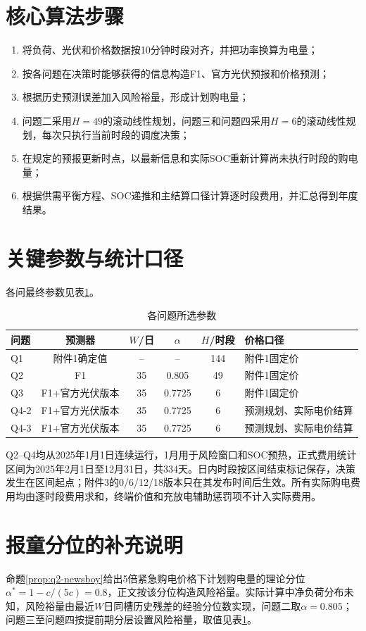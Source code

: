\documentclass[UTF8,12pt,a4paper]{ctexart}
\theoremstyle{remark}
\begin{document}


\clearpage\appendix
\section{核心算法步骤}
\begin{enumerate}
\item 将负荷、光伏和价格数据按10分钟时段对齐，并把功率换算为电量；
\item 按各问题在决策时能够获得的信息构造F1、官方光伏预报和价格预测；
\item 根据历史预测误差加入风险裕量，形成计划购电量；
\item 问题二采用$H=49$的滚动线性规划，问题三和问题四采用$H=6$的滚动线性规划，每次只执行当前时段的调度决策；
\item 在规定的预报更新时点，以最新信息和实际SOC重新计算尚未执行时段的购电量；
\item 根据供需平衡方程、SOC递推和主结算口径计算逐时段费用，并汇总得到年度结果。
\end{enumerate}

\section{关键参数与统计口径}
各问最终参数见表\ref{tab:appendix-params}。
\begin{table}[H]\centering\small
\caption{各问题所选参数}\label{tab:appendix-params}
\begin{tabular}{lccccl}\toprule
问题&预测器&$W$/日&$\alpha$&$H$/时段&价格口径\\\midrule
Q1&附件1确定值&--&--&144&附件1固定价\\
Q2&F1&35&0.805&49&附件1固定价\\
Q3&F1+官方光伏版本&35&0.7725&6&附件1固定价\\
Q4-2&F1+官方光伏版本&35&0.7725&6&预测规划、实际电价结算\\
Q4-3&F1+官方光伏版本&35&0.7725&6&预测规划、实际电价结算\\\bottomrule
\end{tabular}\end{table}

Q2--Q4均从2025年1月1日连续运行，1月用于风险窗口和SOC预热，正式费用统计区间为2025年2月1日至12月31日，共334天。日内时段按区间结束标记保存，决策发生在区间起点；附件3的0/6/12/18版本只在其发布时间后生效。所有实际购电费用均由逐时段费用求和，终端价值和充放电辅助惩罚项不计入实际费用。

\section{报童分位的补充说明}
命题\ref{prop:q2-newsboy}给出5倍紧急购电价格下计划购电量的理论分位$\alpha^\ast=1-c/(5c)=0.8$，正文按该分位构造风险裕量。实际计算中净负荷分布未知，风险裕量由最近$W$日同槽历史残差的经验分位数实现，问题二取$\alpha=0.805$；问题三至问题四按提前期分层设置风险裕量，取值见表\ref{tab:appendix-params}。
\end{document}
